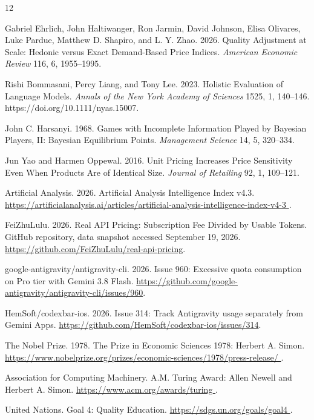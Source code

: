 \documentclass[sigconf,nonacm]{acmart}
\begin{document}
\begin{thebibliography}{12}

Gabriel Ehrlich,
John Haltiwanger,
Ron Jarmin,
David Johnson,
Elisa Olivares,
Luke Pardue,
Matthew D. Shapiro,
and L. Y. Zhao.
2026.
Quality Adjustment at Scale:
Hedonic versus Exact Demand-Based Price Indices.
\emph{American Economic Review}
116, 6, 1955--1995.

Rishi Bommasani,
Percy Liang,
and Tony Lee.
2023.
Holistic Evaluation of Language Models.
\emph{Annals of the New York Academy of Sciences}
1525, 1, 140--146.
https://doi.org/10.1111/nyas.15007.

John C. Harsanyi.
1968.
Games with Incomplete Information Played by Bayesian Players, II:
Bayesian Equilibrium Points.
\emph{Management Science}
14, 5, 320--334.

Jun Yao and Harmen Oppewal.
2016.
Unit Pricing Increases Price Sensitivity Even When Products Are of Identical Size.
\emph{Journal of Retailing}
92, 1, 109--121.

Artificial Analysis.
2026.
Artificial Analysis Intelligence Index v4.3.
\url{
https://artificialanalysis.ai/articles/artificial-analysis-intelligence-index-v4-3
}.

FeiZhuLulu.
2026.
Real API Pricing: Subscription Fee Divided by Usable Tokens.
GitHub repository, data snapshot accessed September 19, 2026.
\url{https://github.com/FeiZhuLulu/real-api-pricing}.

google-antigravity/antigravity-cli.
2026.
Issue 960: Excessive quota consumption on Pro tier with Gemini 3.8 Flash.
\url{https://github.com/google-antigravity/antigravity-cli/issues/960}.

HemSoft/codexbar-ios.
2026.
Issue 314: Track Antigravity usage separately from Gemini Apps.
\url{https://github.com/HemSoft/codexbar-ios/issues/314}.

The Nobel Prize.
1978.
The Prize in Economic Sciences 1978:
Herbert A. Simon.
\url{
https://www.nobelprize.org/prizes/economic-sciences/1978/press-release/
}.

Association for Computing Machinery.
A.M. Turing Award:
Allen Newell and Herbert A. Simon.
\url{
https://www.acm.org/awards/turing
}.

United Nations.
Goal 4:
Quality Education.
\url{
https://sdgs.un.org/goals/goal4
}.

\end{thebibliography}
\end{document}
